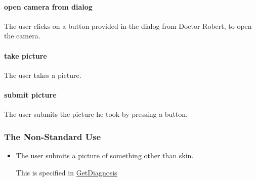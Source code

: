         \paragraph{open camera from dialog}
        The user clicks on a button provided in the dialog from Doctor Robert, to open the camera.
        
        \paragraph{take picture}
        The user takes a picture.
        
        \paragraph{submit picture}
        The user submits the picture he took by pressing a button.
    
    \subsubsection{The Non-Standard Use}
        
        \begin{itemize}
            \item The user submits a picture of something other than skin.
            
                This is specified in \hyperlink{ScanSkinNonStandard}{GetDiagnosis}
        \end{itemize}{}
        
\pagebreak
